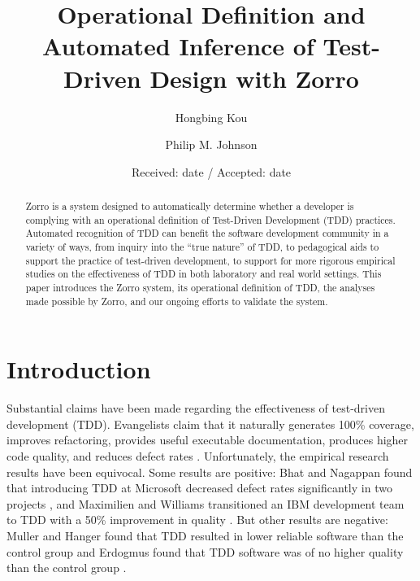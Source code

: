 \documentclass[smallextended]{svjour3}     %
\begin{document}
\title{Operational Definition and Automated Inference of Test-Driven Design with Zorro}
\author{Hongbing Kou \and Philip M. Johnson}

\date{Received: date / Accepted: date}

\maketitle

\begin{abstract}
Zorro is a system designed to automatically determine whether a developer
is complying with an operational definition of Test-Driven Development
(TDD) practices.  Automated recognition of TDD can benefit the software
development community in a variety of ways, from inquiry into the ``true
nature'' of TDD, to pedagogical aids to support the practice of test-driven
development, to support for more rigorous empirical studies on the effectiveness
of TDD in both laboratory and real world settings.  This paper introduces
the Zorro system, its operational definition of TDD, the analyses made
possible by Zorro, and our ongoing efforts to validate the system.
\end{abstract}

\section{Introduction}
\label{intro}

Substantial claims have been made regarding the effectiveness of
test-driven development (TDD). Evangelists claim that it naturally
generates 100\% coverage, improves refactoring, provides useful executable
documentation, produces higher code quality, and reduces defect rates
\cite{Beck:03}.  Unfortunately, the empirical research results
have been equivocal.  Some results are positive: Bhat and Nagappan
found that introducing TDD at Microsoft decreased defect rates significantly in two projects
\cite{Bhat:06}, and Maximilien and Williams transitioned an IBM development
team to TDD with a 50\% improvement in quality \cite{Maximilien:03}. But other
results are negative: Muller and Hanger found that TDD resulted in lower
reliable software than the control group \cite{Muller:02} and Erdogmus
found that TDD software was of no higher quality than the control group
\cite{Erdogmus:05}.
\end{document}
